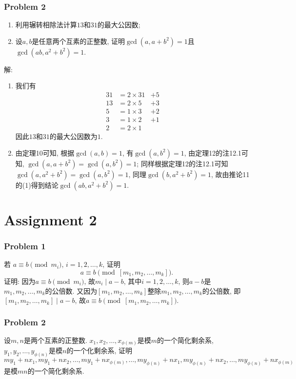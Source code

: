 \documentclass[a4paper,12pt]{ctexart}
\begin{document}
\subsubsection*{Problem 2} 
  \begin{enumerate}[label=(\arabic{*})]
      \item 利用辗转相除法计算$13$和$31$的最大公因数;
      \item 设$a,b$是任意两个互素的正整数, 证明$\gcd(a,a+b^2)=1$且$\gcd(ab,a^2+b^2)=1$.
  \end{enumerate}
  解: 
       \begin{enumerate}[label=(\arabic{*})]
          \item 我们有 \begin{align*}
              31&=2\times 31&+5\\
              13&=2\times 5 &+3\\
               5&=1\times 3 &+2\\
               3&=1\times 2 &+1\\
               2&=2\times 1&
          \end{align*}
          因此$13$和$31$的最大公因数为$1$.
          \item 由定理10可知, 根据$\gcd(a,b)=1$, 有$\gcd(a,b^2)=1$, 由定理12的注12.1可知, $\gcd(a,a+b^2)=\gcd(a,b^2)=1$; 同样根据定理12的注12.1可知$\gcd(a,a^2+b^2)=\gcd(a,b^2)=1$, 同理$\gcd(b,a^2+b^2)=1$, 故由推论11的(1)得到结论$\gcd(ab,a^2+b^2)=1$.
      \end{enumerate}  


\section*{Assignment 2}
  \subsubsection*{Problem 1}
  若 $a\equiv b\pmod{m_i}$, $i =1,2,\dots,k$, 证明
  \[a\equiv b\pmod{\left[ m_1,m_2,\dots,m_k \right]}.\]
  证明: 因为$a\equiv b\pmod{m_i}$, 故$m_i\mid a-b$, 其中$i=1,2,\dots,k$, 则$a-b$是$m_1,m_2,\dots,m_k$的公倍数. 又因为$\left[ m_1,m_2,\dots,m_k \right]$整除$m_1,m_2,\dots,m_k$的公倍数, 即$\left[ m_1,m_2,\dots,m_k \right]\mid a-b$, 故$a\equiv b\pmod{\left[ m_1,m_2,\dots,m_k \right]}$.
\subsubsection*{Problem 2} 
  设$m,n$是两个互素的正整数. $x_1, x_2,\dots , x_{\phi(m)}$是模$m$的一个简化剩余系, $y_1, y_2, \dots , y_{\phi(n)}$是模$n$的一个化剩余系, 证明$my_1 + nx_1, my_1 + nx_2, \dots , my_1 + nx_{\phi(m)}, \dots , my_{\phi(n)} + nx_1, my_{\phi(n)} + nx_2, \dots , my_{\phi(n)} + nx_{\phi(m)}$ 是模$mn$的一个简化剩余系.
  
\end{document}
